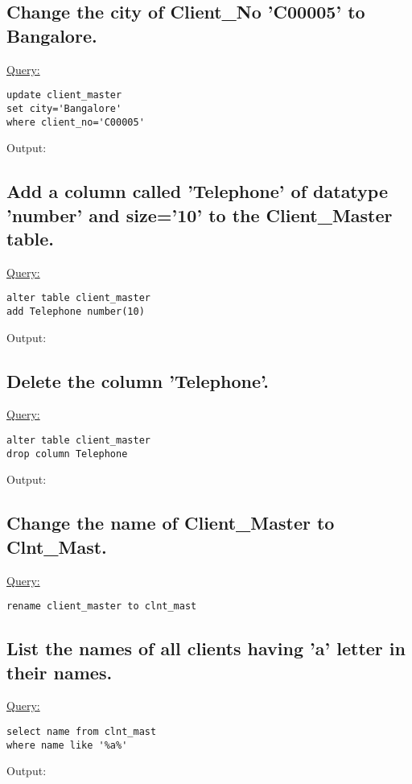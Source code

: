 \documentclass[a4paper,11pt]{article}
\begin{document}
\subsection{Change the city of Client\_No 'C00005' to Bangalore.}
\underline{Query:}
\begin{lstlisting}[showstringspaces=false]
update client_master
set city='Bangalore'
where client_no='C00005'
\end{lstlisting}
Output:
\begin{figure}[H]
\centering
{}
\end{figure}
\bigskip

\subsection{Add a column called 'Telephone' of datatype 'number' and size='10' to the Client\_Master table.}
\underline{Query:}
\begin{lstlisting}[showstringspaces=false]
alter table client_master
add Telephone number(10)
\end{lstlisting}
Output:
\begin{figure}[H]
\centering

\end{figure}

\subsection{Delete the column 'Telephone'.}
\underline{Query:}
\begin{lstlisting}[showstringspaces=false]
alter table client_master
drop column Telephone
\end{lstlisting}
Output:
\begin{figure}[H]
\centering

\end{figure}

\subsection{Change the name of Client\_Master to Clnt\_Mast.}
\underline{Query:}
\begin{lstlisting}[showstringspaces=false]
rename client_master to clnt_mast
\end{lstlisting}
\begin{figure}[H]
\centering
\end{figure}
\subsection{List the names of all clients having 'a' letter in their names.}
\underline{Query:}
\begin{lstlisting}[showstringspaces=false]
select name from clnt_mast
where name like '%a%'
\end{lstlisting}
Output:
\begin{figure}[H]
\centering
{}
\end{figure}
\end{document}
